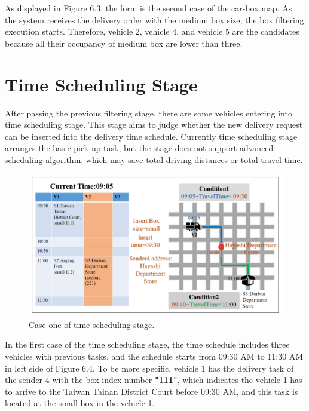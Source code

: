 \documentclass[12pt]{ksthesis}
\begin{document}
\begin{thesis}
{As displayed in Figure 6.3, the form is the second case of the car-box map. As the system receives the delivery order with the medium box size, the box filtering execution starts. Therefore, vehicle 2, vehicle 4, and vehicle 5 are the candidates because all their occupancy of medium box are lower than three.

\section{Time Scheduling Stage}

After passing the previous filtering stage, there are some vehicles entering into time scheduling stage. This stage aims to judge whether the new delivery request can be inserted into the delivery time schedule. Currently time scheduling stage arranges the basic pick-up task, but the stage does not support advanced scheduling algorithm, which may save total driving distances or total travel time.

\begin{figure}[H]
\centering
\includegraphics[width=1.0\textwidth]{./Thesis_figures/F6-4_caseOne_SchedulingStage.PNG}
\caption{\large Case one of time scheduling stage.}
\vspace{0.5cm}
\label{Fig:CaseOne_TimeFiltering}
\end{figure}

In the first case of the time scheduling stage, 
the time schedule includes three vehicles with previous tasks, and the schedule starts from 09:30 AM to 11:30 AM in left side of Figure 6.4. To be more specific, vehicle 1 has the delivery task of the sender 4 with the box index number \textbf{"111"}, which indicates the vehicle 1 has to arrive to the Taiwan Tainan District Court before 09:30 AM, and this task is located at the small box in the vehicle 1.

}
\end{thesis}
\end{document}
